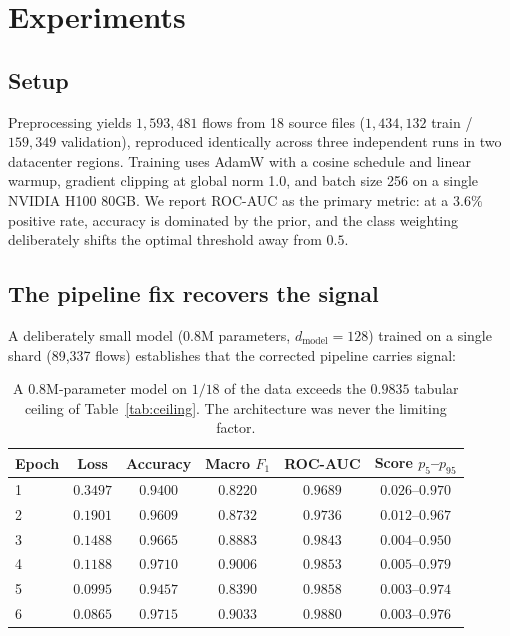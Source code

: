 \documentclass[11pt]{article}
\begin{document}
\section{Experiments}
\label{sec:experiments}

\subsection{Setup}

Preprocessing yields $1{,}593{,}481$ flows from 18 source files
($1{,}434{,}132$ train / $159{,}349$ validation), reproduced identically across
three independent runs in two datacenter regions. Training uses AdamW
\citep{loshchilov2019adamw} with a cosine schedule and linear warmup, gradient
clipping at global norm 1.0, and batch size 256 on a single NVIDIA H100 80GB.
We report ROC-AUC as the primary metric: at a $3.6\%$ positive rate, accuracy is
dominated by the prior, and the class weighting deliberately shifts the optimal
threshold away from $0.5$.

\subsection{The pipeline fix recovers the signal}

A deliberately small model (0.8M parameters, $d_{\text{model}} = 128$) trained on
a single shard (89{,}337 flows) establishes that the corrected pipeline carries
signal:

\begin{table}[h]
\centering
\begin{tabular}{lccccc}
\toprule
Epoch & Loss & Accuracy & Macro $F_1$ & ROC-AUC & Score $p_{5}$--$p_{95}$ \\
\midrule
1 & $0.3497$ & $0.9400$ & $0.8220$ & $0.9689$ & $0.026$--$0.970$ \\
2 & $0.1901$ & $0.9609$ & $0.8732$ & $0.9736$ & $0.012$--$0.967$ \\
3 & $0.1488$ & $0.9665$ & $0.8883$ & $0.9843$ & $0.004$--$0.950$ \\
4 & $0.1188$ & $0.9710$ & $0.9006$ & $0.9853$ & $0.005$--$0.979$ \\
5 & $0.0995$ & $0.9457$ & $0.8390$ & $0.9858$ & $0.003$--$0.974$ \\
6 & $0.0865$ & $0.9715$ & $0.9033$ & $\mathbf{0.9880}$ & $0.003$--$0.976$ \\
\bottomrule
\end{tabular}
\caption{A 0.8M-parameter model on $1/18$ of the data exceeds the $0.9835$
tabular ceiling of Table~\ref{tab:ceiling}. The architecture was never the
limiting factor.}
\label{tab:small}
\end{table}
\end{document}
